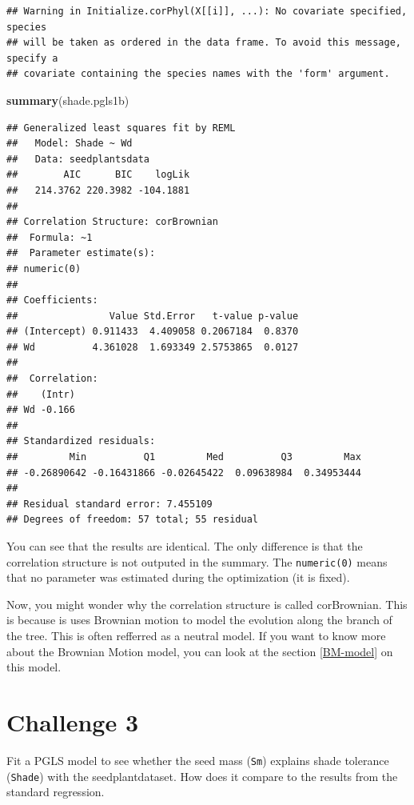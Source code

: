 \documentclass[
]{book}
\newenvironment{Shaded}{\begin{snugshade}}{\end{snugshade}}
\newcommand{\FunctionTok}[1]{\textcolor[rgb]{0.13,0.29,0.53}{\textbf{#1}}}
\newcommand{\NormalTok}[1]{#1}
\begin{document}
\begin{verbatim}
## Warning in Initialize.corPhyl(X[[i]], ...): No covariate specified, species
## will be taken as ordered in the data frame. To avoid this message, specify a
## covariate containing the species names with the 'form' argument.
\end{verbatim}

\begin{Shaded}
\begin{Highlighting}[]
\FunctionTok{summary}\NormalTok{(shade.pgls1b)}
\end{Highlighting}
\end{Shaded}

\begin{verbatim}
## Generalized least squares fit by REML
##   Model: Shade ~ Wd 
##   Data: seedplantsdata 
##        AIC      BIC    logLik
##   214.3762 220.3982 -104.1881
## 
## Correlation Structure: corBrownian
##  Formula: ~1 
##  Parameter estimate(s):
## numeric(0)
## 
## Coefficients:
##                Value Std.Error   t-value p-value
## (Intercept) 0.911433  4.409058 0.2067184  0.8370
## Wd          4.361028  1.693349 2.5753865  0.0127
## 
##  Correlation: 
##    (Intr)
## Wd -0.166
## 
## Standardized residuals:
##         Min          Q1         Med          Q3         Max 
## -0.26890642 -0.16431866 -0.02645422  0.09638984  0.34953444 
## 
## Residual standard error: 7.455109 
## Degrees of freedom: 57 total; 55 residual
\end{verbatim}

You can see that the results are identical. The only difference is that the correlation structure is not outputed in the summary. The \texttt{numeric(0)} means that no parameter was estimated during the optimization (it is fixed).

Now, you might wonder why the correlation structure is called corBrownian. This is because is uses Brownian motion to model the evolution along the branch of the tree. This is often refferred as a neutral model. If you want to know more about the Brownian Motion model, you can look at the section \ref{BM-model} on this model.

\section{Challenge 3}\label{challenge-3}

Fit a PGLS model to see whether the seed mass (\texttt{Sm}) explains shade tolerance (\texttt{Shade}) with the seedplantdataset. How does it compare to the results from the standard regression.
\end{document}
